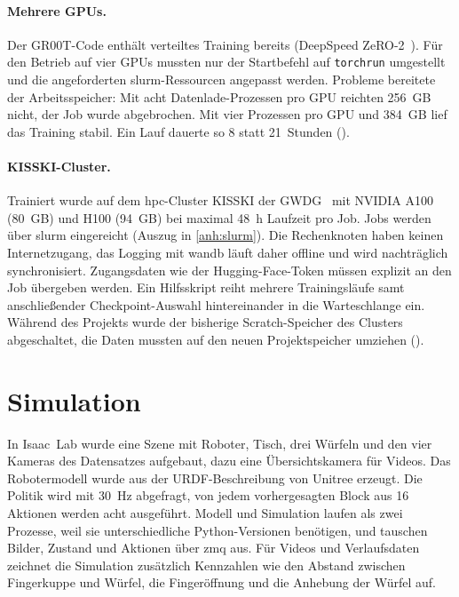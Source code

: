 \paragraph{Mehrere GPUs.}
\label{sec:multi-gpu}
Der GR00T-Code enthält verteiltes Training bereits (DeepSpeed
ZeRO-2~\cite{zero2020}). Für den Betrieb auf vier GPUs mussten nur der
Startbefehl auf \texttt{torchrun} umgestellt und die angeforderten
\ac{slurm}-Ressourcen angepasst werden. Probleme bereitete der
Arbeitsspeicher: Mit acht Datenlade-Prozessen pro GPU reichten 256~GB nicht,
der Job wurde abgebrochen. Mit vier Prozessen pro GPU und 384~GB lief das
Training stabil. Ein Lauf dauerte so 8 statt 21~Stunden
().

\paragraph{KISSKI-Cluster.}
\label{sec:kisski}
Trainiert wurde auf dem \ac{hpc}-Cluster KISSKI der GWDG~\cite{kisski} mit
NVIDIA A100 (80~GB) und H100 (94~GB) bei maximal 48~h Laufzeit pro Job. Jobs
werden über \ac{slurm} eingereicht (Auszug in \cref{anh:slurm}). Die
Rechenknoten haben keinen Internetzugang, das Logging mit \ac{wandb} läuft
daher offline und wird nachträglich synchronisiert. Zugangsdaten wie der
Hugging-Face-Token müssen explizit an den Job übergeben werden. Ein
Hilfsskript reiht mehrere Trainingsläufe samt anschließender
Checkpoint-Auswahl hintereinander in die Warteschlange ein. Während des
Projekts wurde der bisherige Scratch-Speicher des Clusters abgeschaltet, die
Daten mussten auf den neuen Projektspeicher umziehen
().

\section{Simulation}
\label{sec:simulation}

In Isaac~Lab wurde eine Szene mit Roboter, Tisch, drei Würfeln und den vier
Kameras des Datensatzes aufgebaut, dazu eine Übersichtskamera für Videos. Das
Robotermodell wurde aus der URDF-Beschreibung von Unitree erzeugt. Die Politik
wird mit 30~Hz abgefragt, von jedem vorhergesagten Block aus 16 Aktionen
werden acht ausgeführt. Modell und Simulation laufen als zwei Prozesse, weil
sie unterschiedliche Python-Versionen benötigen, und tauschen Bilder, Zustand
und Aktionen über \ac{zmq} aus. Für Videos und Verlaufsdaten zeichnet die
Simulation zusätzlich Kennzahlen wie den Abstand zwischen Fingerkuppe und
Würfel, die Fingeröffnung und die Anhebung der Würfel auf.


